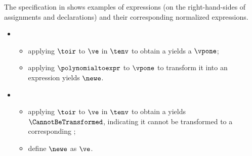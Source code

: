 The specification in  shows examples of expressions (on the right-hand-sides of assignments and declarations)
and their corresponding normalized expressions.

\ProseParagraph
\OneApplies
\begin{itemize}
  \item {}
  \begin{itemize}
    \item applying $\toir$ to $\ve$ in $\tenv$ to obtain a \symbolicexpressionterm{} yields a \symbolicexpressionterm{} $\vpone$\ProseOrTypeError;
    \item applying $\polynomialtoexpr$ to $\vpone$ to transform it into an expression yields $\newe$.
  \end{itemize}

  \item {}
  \begin{itemize}
    \item applying $\toir$ to $\ve$ in $\tenv$ to obtain a \symbolicexpressionterm{} yields $\CannotBeTransformed$,
          indicating it cannot be transformed to a corresponding \symbolicexpressionterm{};
    \item define $\newe$ as $\ve$.
  \end{itemize}
\end{itemize}
\FormallyParagraph
{}


